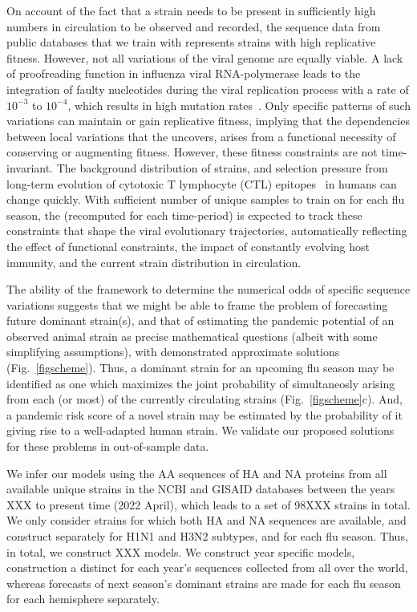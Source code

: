 \documentclass[onecolumn, compsoc,10pt]{IEEEtran}
\begin{document}
On account of the fact that  a  strain needs  to be present in sufficiently high numbers in circulation to be  observed and recorded, the sequence data from public databases that we train  with represents strains with high replicative fitness. However, not all variations of the viral genome are equally viable. A lack of proofreading function in influenza viral RNA-polymerase leads to the integration of faulty nucleotides during the viral replication process with a rate of $10^{-3}$ to $10^{-4}$, which results in high mutation rates~\cite{ahlquist2002rna,chen2006avian}. Only specific patterns of such variations can maintain or gain replicative fitness, implying that  the  dependencies between local variations that the \enet uncovers, arises from a  functional necessity of conserving or augmenting  fitness. However, these fitness constraints are not time-invariant. The background distribution of strains, and selection pressure from   long-term evolution of cytotoxic T lymphocyte (CTL) epitopes~\cite{woolthuis2016long,fan2012role,van2016differential,berkhoff2007assessment,van2012evasion} in humans can change quickly. With sufficient number of unique samples to train on for each flu season, the \enet (recomputed for each time-period) is expected to  track these constraints that shape the viral evolutionary trajectories, automatically reflecting the effect of  functional constraints, the impact of constantly evolving host immunity, and the current strain distribution in circulation.  

The ability of the \enet framework to determine the numerical odds of specific sequence variations suggests that we might be able to frame the problem of forecasting future dominant strain(s), and that of estimating the  pandemic potential of an observed animal strain as precise mathematical questions (albeit with some simplifying assumptions), with demonstrated approximate solutions (Fig.~\ref{figscheme}). Thus,  a dominant strain for an upcoming flu season
may be identified as one which maximizes the joint probability of simultaneosly arising from each (or most)  of the currently circulating strains (Fig.~\ref{figscheme}c).
And, a pandemic risk score of a novel strain may be estimated by the probability of it giving rise to a well-adapted human strain.  We validate  our proposed solutions for these problems in out-of-sample data.

We infer our models using the AA sequences of HA and NA proteins from all available unique \infl strains in the NCBI and GISAID databases between the years XXX to present time (2022 April), which leads to a set of 98XXX strains in total. We only consider strains for which both HA and NA sequences are available, and construct  separately for H1N1 and H3N2 subtypes, and for each flu season. Thus, in total, we construct XXX models. We construct year specific models, construction a distinct \enet for each year's sequences collected from all over the world, whereas forecasts of next season's dominant strains are made for each flu season for each hemisphere separately.
\end{document}
